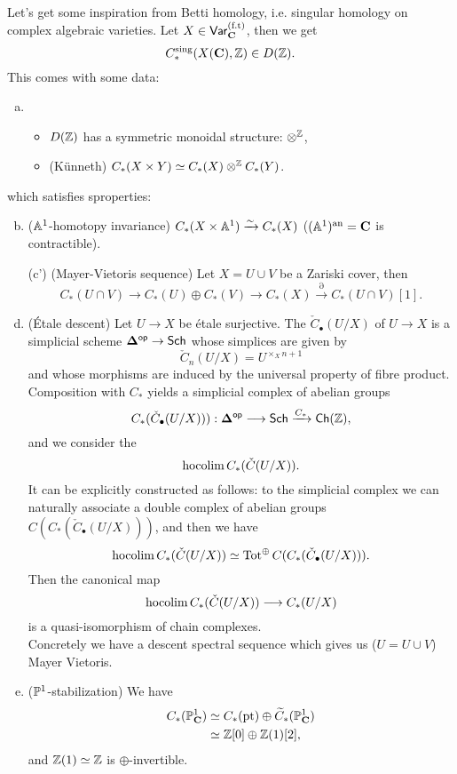 Let's get some inspiration from Betti homology, i.e. singular homology on complex
algebraic varieties. Let $X\in \cat{Var}_{\bb{C}}\ft$, then we get
\[
C_*^{\text{sing}}(X(\bb{C}),\Z)\in D(\Z)
.\]
This comes with some data:
\begin{enumerate}[(a)]
\item
\begin{itemize}
\item $D(\Z)$ has a symmetric monoidal structure: $\otimes^{\Z}$,
\item (K\"unneth) $C_*(X\times Y) \simeq C_*(X)\otimes^{\Z}C_*(Y)$.
\end{itemize}
\end{enumerate}
which satisfies sproperties:
\begin{enumerate}[(a)]
\setcounter{enumi}{1}
\item ($\Aff^{1}$-homotopy invariance) $C_*(X\times \Aff^{1})\simto C_*(X)$
($(\Aff^{1})\an=\bb{C}$ is contractible).
\item[(c')] (Mayer-Vietoris sequence) Let $X=U \cup V$ be a Zariski cover, then
\[
C_*(U\cap V) \to C_*(U) \oplus C_*(V) \to C_*(X) \xrightarrow{\partial} C_*(U \cap  V)[1]
.\]
\item (\'Etale descent) Let $U\to X$ be \'etale surjective. The
 $\check{C}_\bullet(U /X)$ of $U\to X$ is a simplicial scheme
$\bb{\Delta}\op\to \Sch$ whose
simplices are given by
\[
\check{C}_n(U /X) = U^{\times_X n+1}
\]
and whose morphisms are induced by the universal property of fibre product.\\
Composition with $C_*$ yields a simplicial complex of abelian groups
\[C_*(\check{C}_\bullet(U /X))):\bb{\Delta}\op\to \Sch \xrightarrow{C_*} \Ch(\Z),\]
and we consider the 
\[ \hocolim C_*(\check{C}(U /X)). \]
It can be explicitly constructed as follows: to the simplicial complex we can naturally
associate a double complex of abelian groups
$C(C_*(\check{C}_\bullet(U /X)))$, and then we have
\[ \hocolim C_*(\check{C}(U /X))\isoto \Tot^{\oplus} C(C_*(\check{C}_\bullet(U /X))). \]
Then the canonical map
\[  \hocolim C_*(\check{C}(U /X))\to C_*(U /X)  \]
is a quasi-isomorphism of chain complexes.\\
Concretely we have a descent spectral sequence which gives us ($U=U \cup V$) Mayer Vietoris.
\item ($\P^{1}$-stabilization) We have
\begin{align*}
C_*(\P_{\bb{C}}^{1}) &\simeq C_*(\text{pt}) \oplus \wt{C}_*(\P_{\bb{C}}^{1}) \\
&\simeq \Z[0] \oplus \Z(1)[2]
,
\end{align*}
and $\Z(1)\isoto \Z$ is $\oplus$-invertible.
\end{enumerate}
